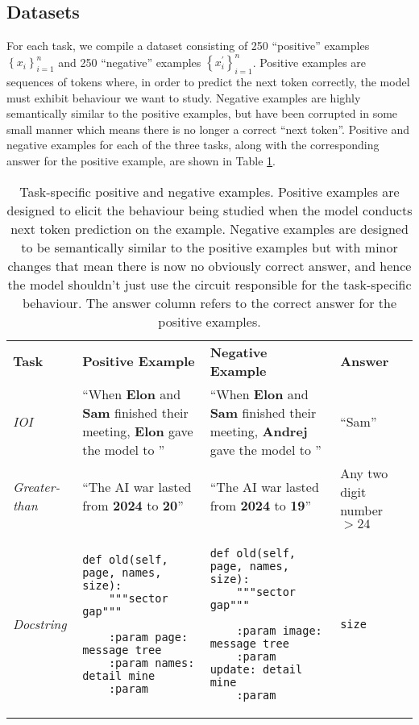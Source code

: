 \documentclass[11pt]{scrartcl}
\begin{document}
\subsection{Datasets}

For each task, we compile a dataset consisting of 250 ``positive'' examples $\left\{x_i\right\}_{i=1}^n$ and 250 ``negative'' examples $\left\{x_i^{\prime}\right\}_{i=1}^n$. Positive examples are sequences of tokens where, in order to predict the next token correctly, the model must exhibit behaviour we want to study. Negative examples are highly semantically similar to the positive examples, but have been corrupted in some small manner which means there is no longer a correct ``next token''. Positive and negative examples for each of the three tasks, along with the corresponding answer for the positive example, are shown in Table \ref{tab:examples}.

\begin{table}[htbp]
\centering
\begin{tabular}{@{}p{2cm}p{4cm}p{4cm}p{2.25cm}@{}}
\toprule
\textbf{Task }      & \textbf{Positive Example}                                              & \textbf{Negative Example}  & \textbf{Answer} \\ \addlinespace
\textit{IOI}        & ``When \textbf{Elon} and \textbf{Sam} finished their meeting, \textbf{Elon} gave the model to '' & ``When \textbf{Elon} and \textbf{Sam} finished their meeting, \textbf{Andrej} gave the model to '' & ``Sam''    \\
\addlinespace %
\textit{Greater-than} & ``The AI war lasted from \textbf{2024} to \textbf{20}'' & ``The AI war lasted from \textbf{2024} to \textbf{19}'' & Any two digit number $>24$      \\
\vspace{2.5mm} \textit{Docstring}  & \begin{lstlisting}
def old(self, page, names, size):
    """sector gap"""
    
    :param page: message tree
    :param names: detail mine
    :param\end{lstlisting}               &  \begin{lstlisting}
def old(self, page, names, size):
    """sector gap"""
    
    :param image: message tree
    :param update: detail mine
    :param\end{lstlisting} 
    &   \vspace{2.5mm} \texttt{size}   \\ \bottomrule
\end{tabular}
\caption{Task-specific positive and negative examples. Positive examples are designed to elicit the behaviour being studied when the model conducts next token prediction on the example. Negative examples are designed to be semantically similar to the positive examples but with minor changes that mean there is now no obviously correct answer, and hence the model shouldn't just use the circuit responsible for the task-specific behaviour. The answer column refers to the correct answer for the positive examples.}
\label{tab:examples}
\end{table}
\end{document}
